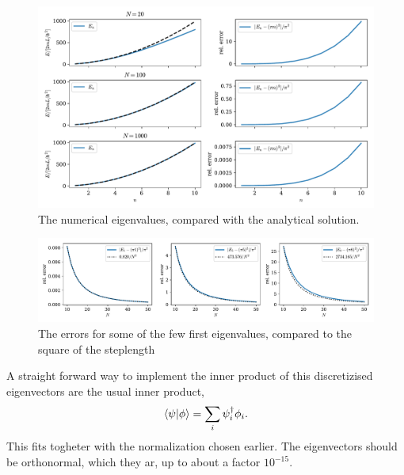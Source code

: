 \documentclass{article}
\begin{document}
    \begin{figure}
        \centering
        \includegraphics[width=\textwidth]{particle_in_box/values}
        \caption{The numerical eigenvalues, compared with the analytical solution.}
        \label{eigenvalues}
    \end{figure}

    \begin{figure}
        \centering
        \includegraphics[width = \textwidth]{particle_in_box/error}
        \caption{The errors for some of the few first eigenvalues, compared to the square of the steplength}
        \label{errors}
    \end{figure}

    A straight forward way to implement the inner product of this discretizised eigenvectors are the usual inner product, 
    \begin{equation*}
        \bra{\psi} \ket{\phi} = \sum_i \psi^\dagger_i \phi_i.
    \end{equation*}
    This fits togheter with the normalization chosen earlier. The eigenvectors should be orthonormal, which they ar, up to about a factor $10^{-15}$.
\end{document}
